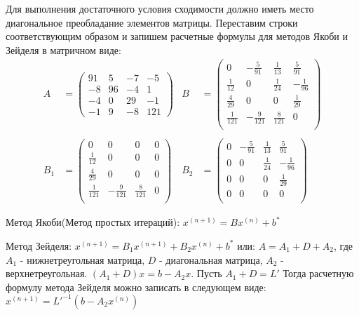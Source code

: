 \documentclass[a4paper,12pt]{report} %
\begin{document}
Для выполнения достаточного условия сходимости должно иметь место диагональное преобладание элементов матрицы. Переставим строки соответствующим образом и запишем расчетные формулы для методов Якоби и Зейделя в матричном виде:
\begin{align*}
	A &= 
	\begin{pmatrix}
		91 & 5 & -7 & -5 \\
		-8 & 96 & -4 & 1 \\
		-4 & 0 & 29 & -1 \\
		-1 & 9 & -8 &  121
	\end{pmatrix}
& 
	B &= 
	\begin{pmatrix}
		0 & -\frac{5}{91} & \frac{1}{13} & \frac{5}{91} \\
		\frac{1}{12} & 0 & \frac{1}{24} & -\frac{1}{96} \\
		\frac{4}{29} & 0 & 0 & \frac{1}{29} \\
		\frac{1}{121} & -\frac{9}{121} & \frac{8}{121} & 0 \\
	\end{pmatrix} \\
\\
	B_1 &= 
	\begin{pmatrix}
		0 & 0 & 0 & 0 \\
		\frac{1}{12} & 0 & 0 & 0 \\
		\frac{4}{29} & 0 & 0 & 0 \\
		\frac{1}{121} & -\frac{9}{121} & \frac{8}{121} & 0 \\
	\end{pmatrix}
&
	B_2 &= 
	\begin{pmatrix}
		0 & -\frac{5}{91} & \frac{1}{13} & \frac{5}{91} \\
		0 & 0 & \frac{1}{24} & -\frac{1}{96} \\
		0 & 0 & 0 & \frac{1}{29} \\
		0 & 0 & 0 & 0 \\
	\end{pmatrix}
\end{align*}

Метод Якоби(Метод простых итераций): $x^{(n+1)} = Bx^{(n)} + b^*$

Метод Зейделя: $x^{(n+1)} = B_1x^{(n+1)} + B_2x^{(n)} + b^*$ или:
$A = A_1 + D + A_2$, где $A_1$ - нижнетреугольная матрица, $D$ - диагональная матрица, $A_2$ - верхнетреугольная.
$(A_1 + D)x = b - A_2x$. Пусть $A_1 + D = L'$ Тогда расчетную формулу метода Зейделя можно записать в следующем виде: 
$x^{(n+1)} = L'^{-1}(b - A_2x^{(n)})$
\end{document}
